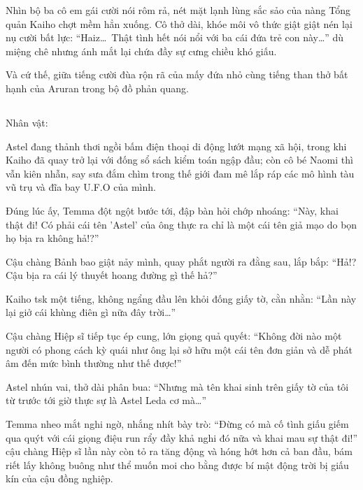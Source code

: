 \documentclass[../main.tex]{subfiles}
\begin{document}
Nhìn bộ ba cô em gái cười nói rôm rả, nét mặt lạnh lùng sắc sảo của nàng Tổng quản Kaiho chợt mềm hẳn xuống. Cô thở dài, khóe môi vô thức giật giật nén lại nụ cười bất lực: ``Haiz\dots\ Thật tình hết nói nổi với ba cái đứa trẻ con này\dots'' dù miệng chê nhưng ánh mắt lại chứa đầy sự cưng chiều khó giấu.

Và cứ thế, giữa tiếng cười đùa rộn rã của mấy đứa nhỏ cùng tiếng than thở bất hạnh của Aruran trong bộ đồ phản quang.

\newpage

\subsection*{\label{ep-M34.V}}
\vspace{-4pt}
\begin{center}
    {\caviar\fontsize{12pt}{12pt}\selectfont Nhân vật:    }
\end{center}

Astel đang thảnh thơi ngồi bấm điện thoại di động lướt mạng xã hội, trong khi Kaiho đã quay trở lại với đống sổ sách kiểm toán ngập đầu; còn cô bé Naomi thì vẫn kiên nhẫn, say sưa đắm chìm trong thế giới đam mê lắp ráp các mô hình tàu vũ trụ và đĩa bay U.F.O của mình.

Đúng lúc ấy, Temma đột ngột bước tới, đập bàn hỏi chớp nhoáng: ``Này, khai thật đi! Có phải cái tên 'Astel' của ông thực ra chỉ là một cái tên giả mạo do bọn họ bịa ra không hả!?''

Cậu chàng Bảnh bao giật nảy mình, quay phắt người ra đằng sau, lắp bắp: ``Hả!? Cậu bịa ra cái lý thuyết hoang đường gì thế hả?''


Kaiho tsk một tiếng, không ngẩng đầu lên khỏi đống giấy tờ, cằn nhằn: ``Lần này lại giở cái khùng điên gì nữa đây trời\dots''

Cậu chàng Hiệp sĩ tiếp tục ép cung, lớn giọng quả quyết: ``Không đời nào một người có phong cách kỳ quái như ông lại sở hữu một cái tên đơn giản và dễ phát âm đến mức bình thường như thế được!''

Astel nhún vai, thở dài phân bua: ``Nhưng mà tên khai sinh trên giấy tờ của tôi từ trước tới giờ thực sự là Astel Leda cơ mà\dots''

Temma nheo mắt nghi ngờ, nhắng nhít bày trò: ``Đừng có mà cố tình giấu giếm qua quýt với cái giọng điệu run rẩy đầy khả nghi đó nữa và khai mau sự thật đi!'' cậu chàng Hiệp sĩ lần này còn tỏ ra tăng động và hóng hớt hơn cả ban đầu, bám riết lấy không buông như thể muốn moi cho bằng được bí mật động trời bị giấu kín của cậu đồng nghiệp.
\end{document}
